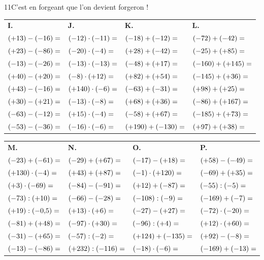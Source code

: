 \begin{exercice}{11}{C’est en forgeant que l’on devient forgeron !}
{\bigskip
\begin{tabularx}{\linewidth}{*{4}{X}}
\textbf{I.} & \textbf{J.} & \textbf{K.} & \textbf{L.} \\
$(+13)-(-16)= \dotfill$ & $(-12)\cdot(-11)= \dotfill$ & $(-18)+(-12)= \dotfill$ & $(-72)+(-42)= \dotfill$ \\
$(+23)-(-86)= \dotfill$ & $(-20)\cdot(-4)= \dotfill$ & $(+28)+(-42)= \dotfill$ & $(-25)+(+85)= \dotfill$ \\
$(-13)-(-26)= \dotfill$ & $(-13)\cdot(-13)= \dotfill$ & $(-48)+(+17)= \dotfill$ & $(-160)+(+145)= \dotfill$ \\
$(+40)-(+20)= \dotfill$ & $(-8)\cdot(+12)= \dotfill$ & $(+82)+(+54)= \dotfill$ & $(-145)+(+36)= \dotfill$ \\
$(+43)-(-16)= \dotfill$ & $(+140)\cdot(-6)= \dotfill$ & $(-63)+(-31)= \dotfill$ & $(+98)+(+25)= \dotfill$ \\
$(+30)-(+21)= \dotfill$ & $(-13)\cdot(-8)= \dotfill$ & $(+68)+(+36)= \dotfill$ & $(-86)+(+167)= \dotfill$ \\
$(-63)-(-12)= \dotfill$ & $(+15)\cdot(-4)= \dotfill$ & $(-58)+(+67)= \dotfill$ & $(-185)+(+73)= \dotfill$ \\
$(-53)-(-36)= \dotfill$ & $(-16)\cdot(-6)= \dotfill$ & $(+190)+(-130)= \dotfill$ & $(+97)+(+38)= \dotfill$ \\
\end{tabularx}

\bigskip
\begin{tabularx}{\linewidth}{*{4}{X}}
\textbf{M.} & \textbf{N.} & \textbf{O.} & \textbf{P.} \\
$(-23)+(-61)= \dotfill$ & $(-29)+(+67)= \dotfill$ & $(-17)-(+18)= \dotfill$ & $(+58)-(-49)= \dotfill$ \\
$(+130)\cdot(-4)= \dotfill$ & $(+43)+(+87)= \dotfill$ & $(-1)\cdot(+120)= \dotfill$ & $(-69)+(+35)= \dotfill$ \\
$(+3)\cdot(-69)= \dotfill$ & $(-84)-(-91)= \dotfill$ & $(+12)+(-87)= \dotfill$ & $(-55):(-5)= \dotfill$ \\
$(-73):(+10)= \dotfill$ & $(-66)-(-28)= \dotfill$ & $(-108):(-9)= \dotfill$ & $(-169)+(-7)= \dotfill$ \\
$(+19):(-0{,}5)= \dotfill$ & $(+13)\cdot(+6)= \dotfill$ & $(-27)-(+27)= \dotfill$ & $(-72)\cdot(-20)= \dotfill$ \\
$(-81)+(+48)= \dotfill$ & $(-97)\cdot(+30)= \dotfill$ & $(-96):(+4)= \dotfill$ & $(+12)\cdot(+60)= \dotfill$ \\
$(-31)-(+65)= \dotfill$ & $(-57):(-2)= \dotfill$ & $(+124)+(-135)= \dotfill$ & $(+92)-(-8)= \dotfill$ \\
$(-13)-(-86)= \dotfill$ & $(+232):(-116)= \dotfill$ & $(-18)\cdot(-6)= \dotfill$ & $(-169)+(-13)= \dotfill$ \\
\end{tabularx}}

\end{exercice}
